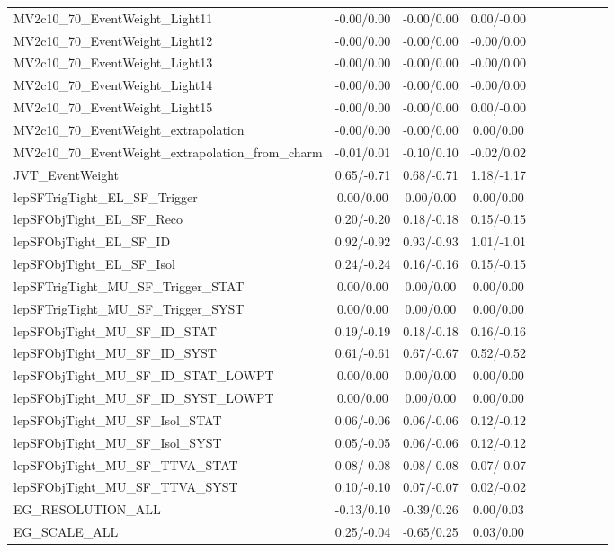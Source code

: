 \begin{table}[h]
\begin{center}
\begin{tabular}{l|ccccccccc}
MV2c10\_70\_EventWeight\_Light11 &-0.00/0.00 &-0.00/0.00 &0.00/-0.00 \\
MV2c10\_70\_EventWeight\_Light12 &-0.00/0.00 &-0.00/0.00 &-0.00/0.00 \\
MV2c10\_70\_EventWeight\_Light13 &-0.00/0.00 &-0.00/0.00 &-0.00/0.00 \\
MV2c10\_70\_EventWeight\_Light14 &-0.00/0.00 &-0.00/0.00 &-0.00/0.00 \\
MV2c10\_70\_EventWeight\_Light15 &-0.00/0.00 &-0.00/0.00 &0.00/-0.00 \\
MV2c10\_70\_EventWeight\_extrapolation &-0.00/0.00 &-0.00/0.00 &0.00/0.00 \\
MV2c10\_70\_EventWeight\_extrapolation\_from\_charm &-0.01/0.01 &-0.10/0.10 &-0.02/0.02 \\
JVT\_EventWeight &0.65/-0.71 &0.68/-0.71 &1.18/-1.17 \\
lepSFTrigTight\_EL\_SF\_Trigger &0.00/0.00 &0.00/0.00 &0.00/0.00 \\
lepSFObjTight\_EL\_SF\_Reco &0.20/-0.20 &0.18/-0.18 &0.15/-0.15 \\
lepSFObjTight\_EL\_SF\_ID &0.92/-0.92 &0.93/-0.93 &1.01/-1.01 \\
lepSFObjTight\_EL\_SF\_Isol &0.24/-0.24 &0.16/-0.16 &0.15/-0.15 \\
lepSFTrigTight\_MU\_SF\_Trigger\_STAT &0.00/0.00 &0.00/0.00 &0.00/0.00 \\
lepSFTrigTight\_MU\_SF\_Trigger\_SYST &0.00/0.00 &0.00/0.00 &0.00/0.00 \\
lepSFObjTight\_MU\_SF\_ID\_STAT &0.19/-0.19 &0.18/-0.18 &0.16/-0.16 \\
lepSFObjTight\_MU\_SF\_ID\_SYST &0.61/-0.61 &0.67/-0.67 &0.52/-0.52 \\
lepSFObjTight\_MU\_SF\_ID\_STAT\_LOWPT &0.00/0.00 &0.00/0.00 &0.00/0.00 \\
lepSFObjTight\_MU\_SF\_ID\_SYST\_LOWPT &0.00/0.00 &0.00/0.00 &0.00/0.00 \\
lepSFObjTight\_MU\_SF\_Isol\_STAT &0.06/-0.06 &0.06/-0.06 &0.12/-0.12 \\
lepSFObjTight\_MU\_SF\_Isol\_SYST &0.05/-0.05 &0.06/-0.06 &0.12/-0.12 \\
lepSFObjTight\_MU\_SF\_TTVA\_STAT &0.08/-0.08 &0.08/-0.08 &0.07/-0.07 \\
lepSFObjTight\_MU\_SF\_TTVA\_SYST &0.10/-0.10 &0.07/-0.07 &0.02/-0.02 \\
EG\_RESOLUTION\_ALL &-0.13/0.10 &-0.39/0.26 &0.00/0.03 \\
EG\_SCALE\_ALL &0.25/-0.04 &-0.65/0.25 &0.03/0.00 \\

\end{tabular}
\end{center}
\end{table}
